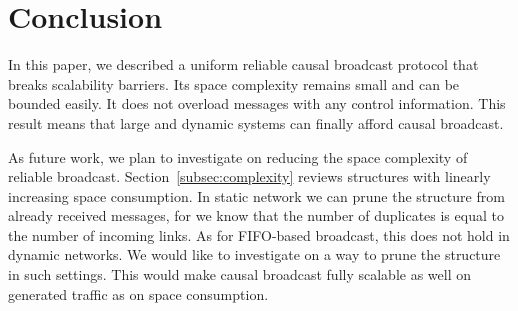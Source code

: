 
\section{Conclusion}
\label{sec:conclusion}



In this paper, we described a uniform reliable causal broadcast protocol that
breaks scalability barriers. Its space complexity remains small and can be
bounded easily. It does not overload messages with any control information. This
result means that large and dynamic systems can finally afford causal broadcast.




As future work, we plan to investigate on reducing the space complexity of
reliable broadcast. Section~\ref{subsec:complexity} reviews structures with
linearly increasing space consumption. In static network we can prune the
structure from already received messages, for we know that the number of
duplicates is equal to the number of incoming links. As for FIFO-based
broadcast, this does not hold in dynamic networks. We would like to investigate
on a way to prune the structure in such settings. This would make causal
broadcast fully scalable as well on generated traffic as on space consumption.







